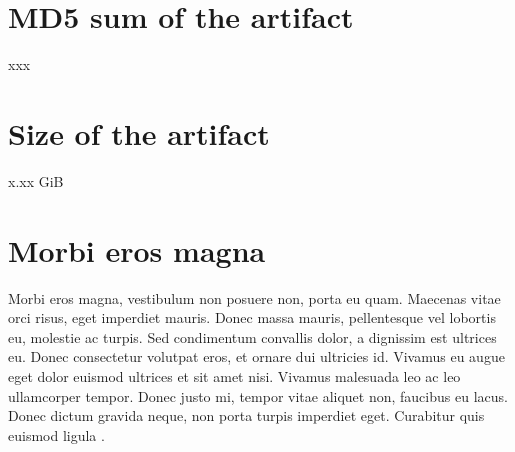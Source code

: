 \documentclass[a4paper,UKenglish]{darts-v2019}
\newcommand{\mdsum}[1]{{\section{MD5 sum of the artifact}#1}}
\newcommand{\artifactsize}[1]{{\section{Size of the artifact}#1}}
\begin{document}
\mdsum{xxx}

\artifactsize{x.xx GiB}

\appendix
\section{Morbi eros magna}

Morbi eros magna, vestibulum non posuere non, porta eu quam. Maecenas vitae orci risus, eget imperdiet mauris. Donec massa mauris, pellentesque vel lobortis eu, molestie ac turpis. Sed condimentum convallis dolor, a dignissim est ultrices eu. Donec consectetur volutpat eros, et ornare dui ultricies id. Vivamus eu augue eget dolor euismod ultrices et sit amet nisi. Vivamus malesuada leo ac leo ullamcorper tempor. Donec justo mi, tempor vitae aliquet non, faucibus eu lacus. Donec dictum gravida neque, non porta turpis imperdiet eget. Curabitur quis euismod ligula \cite{DBLP:books/mk/GrayR93,DBLP:conf/focs/FOCS16,DBLP:conf/focs/HopcroftPV75,DBLP:journals/cacm/Dijkstra68a,DBLP:journals/cacm/Knuth74}. 







\end{document}
